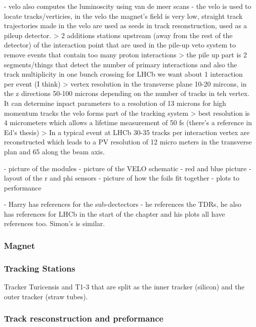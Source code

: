 - velo also computes the luminoscity using van de meer scans
- the velo is used to locate tracks/verticies, in the velo the magnet's field is very low, straight track trajectories made in the velo are used as seeds in track resonstruction, used as a pileup detector.
> 2 additions stations upstream (away from the rest of the detector) of the interaction point that are used in the pile-up veto system to remove events that contain too many proton interactions
> the pile up part is 2 segments/things that detect the number of primary interactions and also the track multiplicity in one bunch crossing for LHCb we want about 1 interaction per event (I think)
> vertex resolution in the transverse plane 10-20 mircons, in the z directions 50-100 microns depending on the number of tracks in teh vertex. It can determine inpact parameters to a resolution of 13 microns for high momentum tracks
 the velo forms part of the tracking system
> best resolution is 4 micrometers which allows a lifetime measurement of 50 fs (there's a reference in Ed's thesis)
> In a typical event at LHCb 30-35 tracks per interaction vertex are reconstructed which leads to a PV resolution of 12 micro meters in the transverse plan and 65 along the beam axis.

- picture of the modules
- picture of the VELO schematic - red and blue picture
- layout of the r and phi sensors
- picture of how the foils fit together
- plots to performance

- Harry has references for the sub-dectectors - he references the TDRs, he also has references for LHCb in the start of the chapter and his plots all have references too. Simon's is similar.

\subsubsection{Magnet}

\subsubsection{Tracking Stations} %
Tracker Turicensis and T1-3 that are split as the inner tracker (silicon) and the outer tracker (straw tubes).
\subsubsection{Track resconstruction and preformance}


